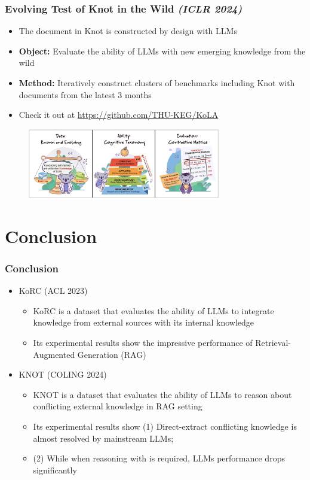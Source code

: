 \documentclass{beamer}
\begin{document}
\begin{frame}
    \frametitle{Evolving Test of Knot in the Wild \textit{{(ICLR 2024)}}}
    \begin{itemize}
        \item The document in Knot is constructed by design with LLMs
        \item \textbf{Object:} Evaluate the ability of LLMs with new emerging knowledge from the wild
        \item \textbf{Method:} Iteratively construct clusters of benchmarks including Knot with documents from the latest 3 months

        \item Check it out at \url{https://github.com/THU-KEG/KoLA}
    \end{itemize}
    
    \begin{figure}
        \includegraphics[width=0.75\textwidth]{figure/kola.png}
    \end{figure}
\end{frame}

\section{Conclusion}
\begin{frame}
    \frametitle{Conclusion}
    \begin{itemize}
        \item KoRC (ACL 2023)
        \begin{itemize}
            \item KoRC is a dataset that evaluates the ability of LLMs to integrate knowledge from external sources with its internal knowledge
            \item Its experimental results show the impressive performance of Retrieval-Augmented Generation (RAG)
        \end{itemize}
        \item KNOT (COLING 2024)
        \begin{itemize}
            \item KNOT is a dataset that evaluates the ability of LLMs to reason about conflicting external knowledge in RAG setting
            \item Its experimental results show (1) Direct-extract conflicting knowledge is almost resolved by mainstream LLMs; 
            \item (2) While when reasoning with is required, LLMs performance drops significantly
        \end{itemize}
    \end{itemize}
\end{frame}

\backmatter
{}


\end{document}
